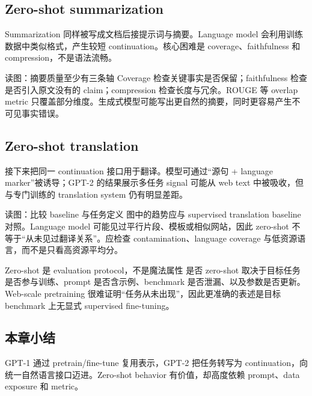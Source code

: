\subsection{Zero-shot summarization}

Summarization 同样被写成文档后接提示词与摘要。Language model 会利用训练数据中类似格式，产生较短 continuation。核心困难是 coverage、faithfulness 和 compression，不是语法流畅。


\begin{knowledgebox}{读图：摘要质量至少有三条轴}
Coverage 检查关键事实是否保留；faithfulness 检查是否引入原文没有的 claim；compression 检查长度与冗余。ROUGE 等 overlap metric 只覆盖部分维度。生成式模型可能写出更自然的摘要，同时更容易产生不可见事实错误。
\end{knowledgebox}

\subsection{Zero-shot translation}

接下来把同一 continuation 接口用于翻译。模型可通过“源句 + language marker”被诱导；GPT-2 的结果展示多任务 signal 可能从 web text 中被吸收，但与专门训练的 translation system 仍有明显差距。


\begin{knowledgebox}{读图：比较 baseline 与任务定义}
图中的趋势应与 supervised translation baseline 对照。Language model 可能见过平行片段、模板或相似网站，因此 zero-shot 不等于“从未见过翻译关系”。应检查 contamination、language coverage 与低资源语言，而不是只看高资源平均分。
\end{knowledgebox}

\begin{warningbox}{Zero-shot 是 evaluation protocol，不是魔法属性}
是否 zero-shot 取决于目标任务是否参与训练、prompt 是否含示例、benchmark 是否泄漏、以及参数是否更新。Web-scale pretraining 很难证明“任务从未出现”，因此更准确的表述是目标 benchmark 上无显式 supervised fine-tuning。
\end{warningbox}

\subsection{本章小结}

GPT-1 通过 pretrain/fine-tune 复用表示，GPT-2 把任务转写为 continuation，向统一自然语言接口迈进。Zero-shot behavior 有价值，却高度依赖 prompt、data exposure 和 metric。

